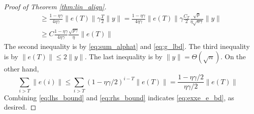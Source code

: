 \begin{proof}[Proof of Theorem \ref{thm:lin_align}]
\begin{equation}
\begin{aligned}
    &\geq \frac{1-\eta\gamma}{4\eta\gamma}\|e(T)\|\gamma\frac{T}{2}\|y\|  = \frac{1-\eta\gamma}{4\eta\gamma} \|e(T)\|\gamma \frac{C_T}{2}\frac{\sqrt p}{\eta\sqrt{n\gamma}}\|y\|\\
    &\geq C\frac{1-\eta\gamma}{4\eta\gamma}\frac{\sqrt {p\gamma}}{\eta}\|e(T)\|
\end{aligned}
\end{equation}
The second inequality is by \eqref{eq:sum_alphat} and \eqref{eq:g_lbd}. The third inequality is by $\|e(T)\|\leq 2\|y\|$. The last inequality is by $\|y\| = \Theta(\sqrt n)$. On the other hand,
\begin{equation}
\label{eq:rhs_bound}
\sum_{i>T}\|e(i)\| \leq \sum_{i>T}(1-\eta\gamma/2)^{i-T}\|e(T)\| =\frac{1-\eta\gamma/2}{\eta\gamma/2}\|e(T)\|
\end{equation}
Combining \eqref{eq:lhs_bound} and \eqref{eq:rhs_bound} indicates \eqref{eq:exxe_e_bd}, as desired.
\end{proof}